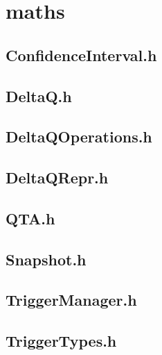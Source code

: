 \section{maths}

\subsection{ConfidenceInterval.h}


\subsection{DeltaQ.h}


\subsection{DeltaQOperations.h}


\subsection{DeltaQRepr.h}


\subsection{QTA.h}


\subsection{Snapshot.h}


\subsection{TriggerManager.h}


\subsection{TriggerTypes.h}


